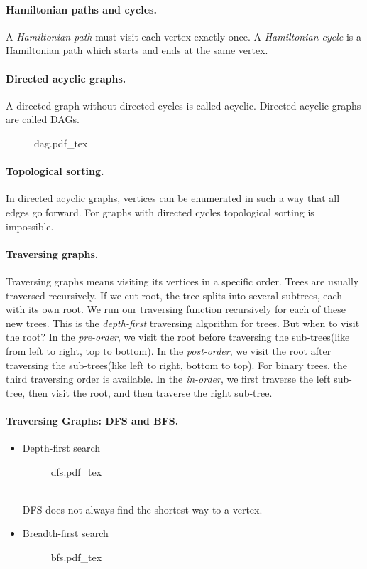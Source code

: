 \documentclass{article}
\newcommand{\incfig}[2][1]{%
    \def\svgwidth{#1\columnwidth}
    {#2.pdf_tex}
}
\begin{document}
\paragraph{Hamiltonian paths and cycles.}
A {\it Hamiltonian path} must visit each vertex exactly once. A {\it Hamiltonian cycle} is a Hamiltonian path which starts and ends at the same vertex.

\newpage

\paragraph{Directed acyclic graphs.}
A directed graph without directed cycles is called acyclic. Directed acyclic graphs are called DAGs.
\begin{figure}[h!]
  \centering
  \incfig{dag}
\end{figure}

\paragraph{Topological sorting.}
In directed acyclic graphs, vertices can be enumerated in such a way that all edges go forward. For graphs with directed cycles topological sorting is impossible.

\paragraph{Traversing graphs.}
Traversing graphs means visiting its vertices in a specific order. Trees are usually traversed recursively. If we cut root, the tree splits into several subtrees, each with its own root. We run our traversing function recursively for each of these new trees. This is the {\it depth-first} traversing algorithm for trees. But when to visit the root? In the {\it pre-order}, we visit the root before traversing the sub-trees(like from left to right, top to bottom). In the {\it post-order}, we visit the root after traversing the sub-trees(like left to right, bottom to top). For binary trees, the third traversing order is available. In the {\it in-order}, we first traverse the left sub-tree, then visit the root, and then traverse the right sub-tree.

\newpage

\paragraph{Traversing Graphs: DFS and BFS.}
\begin{itemize}
  \item Depth-first search
  \begin{figure}[h!]
    \centering
    \incfig{dfs}
  \end{figure}
  \\
  DFS does not always find the shortest way to a vertex.
  \item Breadth-first search
  \begin{figure}[h!]
    \centering
    \incfig{bfs}
  \end{figure}
\end{itemize}
\end{document}
